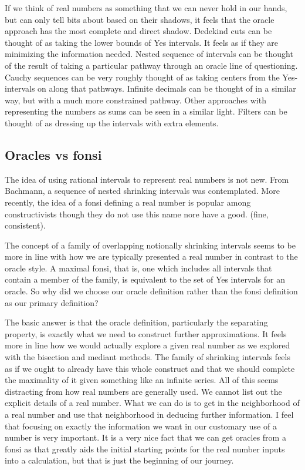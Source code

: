 \documentclass[12pt]{article}
\theoremstyle{remark}
\begin{document}
If we think of real numbers as something that we can never hold in our hands, but can only tell bits about based on their shadows, it feels that the oracle approach has the most complete and direct shadow. Dedekind cuts can be thought of as taking the lower bounds of Yes intervals. It feels as if they are minimizing the information needed.  Nested sequence of intervals can be thought of the result of taking a particular pathway through an oracle line of questioning. Cauchy sequences can be very roughly thought of as taking centers from the Yes-intervals on along that pathways. Infinite decimals can be thought of in a similar way, but with a much more constrained pathway.  Other approaches with representing the numbers as sums can be seen in a  similar light. Filters can be thought of as dressing up the intervals with extra elements.


\subsection{Oracles vs fonsi}

The idea of using rational intervals to represent real numbers is not new. From Bachmann, a sequence of nested shrinking intervals was contemplated. More recently, the idea of a fonsi defining a real number is popular among constructivists though they do not use this name nore have a good.  (fine, consistent).  

The concept of a family of overlapping notionally shrinking intervals seems to be more in line with how we are typically presented a real number in contrast to the oracle style. A maximal fonsi, that is, one which includes all intervals that contain a member of the family, is equivalent to the set of Yes intervals for an oracle.  So why did we choose our oracle definition rather than the fonsi definition as our primary definition? 

The basic answer is that the oracle definition, particularly the separating property, is exactly what we need to construct further approximations. It feels more in line how we would actually explore a given real number as we explored with the bisection and mediant methods. The family of shrinking intervals feels as if we ought to already have this whole construct and that we should complete the maximality of it given something like an infinite series. All of this seems distracting from how real numbers are generally used. We cannot list out the explicit details of a real number. What we can do is to get in the neighborhood of a real number and use that neighborhood in deducing further information. I feel that focusing on exactly the information we want in our customary use of a number is very important. It is a very nice fact that we can get oracles from a fonsi as that greatly aids the initial starting points for the real number inputs into a calculation, but that is just the beginning of our journey. 
\end{document}
